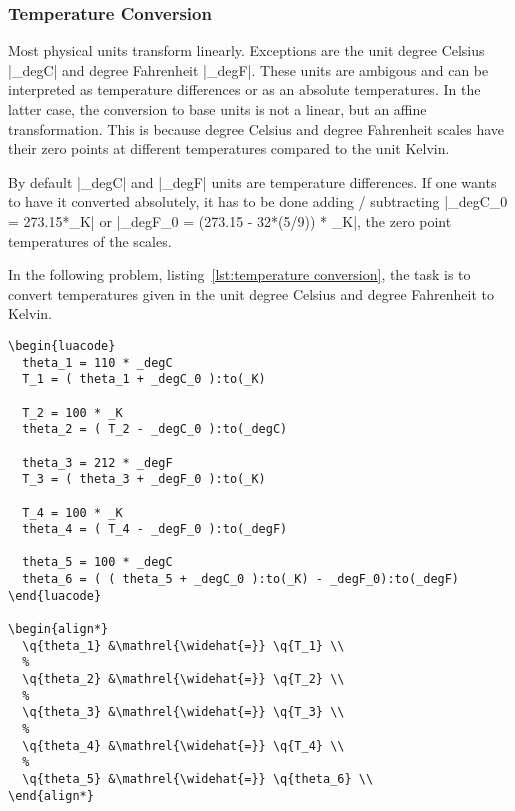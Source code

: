 \documentclass{ltxdoc}
\newcommand{\q}[1]{%
  \directlua{tex.print(physical.Quantity.tosiunitx(#1,"add-decimal-zero=true,scientific-notation=fixed,exponent-to-prefix=false"))}%
}
\begin{document}
\subsubsection{Temperature Conversion}

Most physical units transform linearly. Exceptions are the unit degree Celsius |_degC| and degree Fahrenheit |_degF|. These units are ambigous and can be interpreted as temperature differences or as an absolute temperatures. In the latter case, the conversion to base units is not a linear, but an affine transformation. This is because degree Celsius and degree Fahrenheit scales have their zero points at different temperatures compared to the unit Kelvin.

By default |_degC| and |_degF| units are temperature differences. If one wants to have it converted absolutely, it has to be done adding / subtracting  |_degC_0 = 273.15*_K| or |_degF_0 = (273.15 - 32*(5/9)) * _K|,
the zero point temperatures of the scales.


In the following problem, listing~\ref{lst:temperature conversion}, the task is to convert temperatures given in the unit degree Celsius and degree Fahrenheit to Kelvin.

\begin{lstlisting}[caption=Temperature conversion.,label=lst:temperature conversion]
\begin{luacode}
  theta_1 = 110 * _degC
  T_1 = ( theta_1 + _degC_0 ):to(_K)

  T_2 = 100 * _K
  theta_2 = ( T_2 - _degC_0 ):to(_degC)

  theta_3 = 212 * _degF
  T_3 = ( theta_3 + _degF_0 ):to(_K)

  T_4 = 100 * _K
  theta_4 = ( T_4 - _degF_0 ):to(_degF)

  theta_5 = 100 * _degC
  theta_6 = ( ( theta_5 + _degC_0 ):to(_K) - _degF_0):to(_degF)
\end{luacode}

\begin{align*}
  \q{theta_1} &\mathrel{\widehat{=}} \q{T_1} \\
  %
  \q{theta_2} &\mathrel{\widehat{=}} \q{T_2} \\
  %
  \q{theta_3} &\mathrel{\widehat{=}} \q{T_3} \\
  %
  \q{theta_4} &\mathrel{\widehat{=}} \q{T_4} \\
  %
  \q{theta_5} &\mathrel{\widehat{=}} \q{theta_6} \\
\end{align*}
\end{lstlisting}
\end{document}
